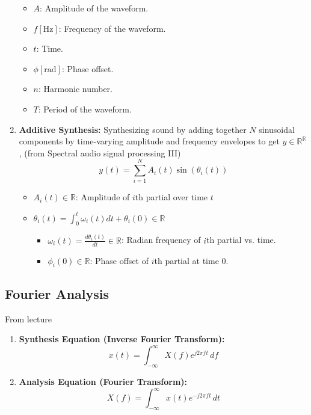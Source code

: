 \documentclass[12pt]{article}
\begin{document}
\begin{enumerate}
    \begin{itemize}
        \item \( A \): Amplitude of the waveform.
        \item \( f [\text{Hz}]\): Frequency of the waveform.
        \item \( t \): Time.
        \item \( \phi [\text{rad}]\): Phase offset.
        \item \( n \): Harmonic number.
        \item \( T \): Period of the waveform.
    \end{itemize}
    \item \textbf{Additive Synthesis:} Synthesizing sound by adding together $N$ sinusoidal components by time-varying amplitude and frequency envelopes to get $y \in \mathbb{R}^{\mathbb{R}}$, (from Spectral audio signal processing III)
    \begin{equation}
        y(t) = \sum_{i=1}^{N} A_i(t) \sin\left(\theta_i (t)\right)
    \end{equation}
    \begin{itemize}
        \item $A_i(t) \in \mathbb{R}$: Amplitude of $i$th partial over time $t$
        \item $\theta_i (t) = \int_0^t \omega_i(t)dt + \theta_i(0) \in \mathbb{R}$
        \begin{itemize}
            \item $\omega_i(t)=\frac{d\theta_i(t)}{dt} \in \mathbb{R}$: Radian frequency of $i$th partial vs. time.
            \item $\phi_i(0) \in \mathbb{R}$: Phase offset of $i$th partial at time $0$.
        \end{itemize}
    \end{itemize}
\end{enumerate}
\subsection{Fourier Analysis}
From lecture
\begin{enumerate}
    \item \textbf{Synthesis Equation (Inverse Fourier Transform):}
    \begin{equation}
        x(t) = \int_{-\infty}^{\infty} X(f) e^{j 2 \pi f t} \, df
    \end{equation}

    \item \textbf{Analysis Equation (Fourier Transform):}
    \begin{equation}
        X(f) = \int_{-\infty}^{\infty} x(t) e^{-j 2 \pi f t} \, dt
    \end{equation}

\end{enumerate}
\end{document}
